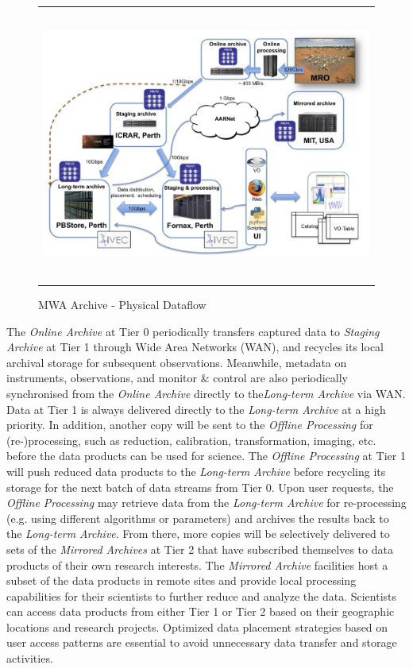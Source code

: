    \begin{figure}
   \begin{center}
   \begin{tabular}{c}
   \includegraphics[height=9cm]{part6/Wu_P34/P34_f2.eps}
   \end{tabular}
   \end{center}
   \caption[example] 

   { \label{fig:phy_dataflow} 
MWA Archive - Physical Dataflow}
   \end{figure} 

The \emph{Online Archive} at Tier 0 periodically transfers captured data to \emph{Staging Archive} at Tier 1 through Wide Area Networks (WAN), and recycles its local archival storage for subsequent observations. Meanwhile, metadata on instruments, observations, and monitor \& control are also periodically synchronised from the \emph{Online Archive} directly to the\emph{Long-term Archive} via WAN. Data at Tier 1 is always delivered directly to the \emph{Long-term Archive} at a high priority.  In addition, another copy will be sent to the \emph{Offline Processing} for (re-)processing, such as reduction, calibration, transformation, imaging, etc. before the data products can be used for science. The \emph{Offline Processing} at Tier 1 will push reduced data products to the \emph{Long-term Archive} before recycling its storage for the next batch of data streams from Tier 0. Upon user requests, the \emph{Offline Processing} may retrieve data from the \emph{Long-term Archive} for re-processing (e.g. using different algorithms or parameters) and archives the results back to the \emph{Long-term Archive}. From there, more copies will be selectively delivered to sets of the \emph{Mirrored Archives} at Tier 2 that have subscribed themselves to data products of their own research interests. The \emph{Mirrored Archive} facilities host a subset of the data products in remote sites and provide local processing capabilities for their scientists to further reduce and analyze the data. Scientists can access data products from either Tier 1 or Tier 2 based on their geographic locations and research projects. Optimized data placement strategies based on user access patterns are essential to avoid unnecessary data transfer and storage activities.


